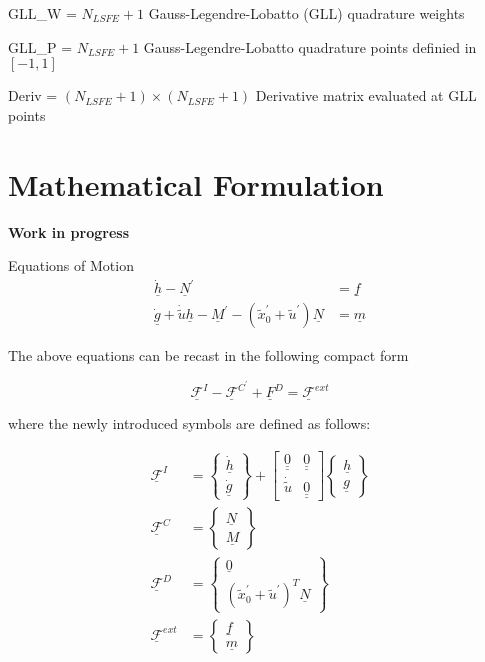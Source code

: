 \documentclass[11pt]{article}
\begin{document}
GLL\_W = $N_{LSFE} + 1$  Gauss-Legendre-Lobatto (GLL) quadrature weights 

GLL\_P = $N_{LSFE} + 1$  Gauss-Legendre-Lobatto quadrature points definied in
$[-1,1]$

Deriv = $(N_{LSFE} + 1) \times (N_{LSFE} + 1)$ Derivative matrix evaluated at GLL points

\section*{Mathematical Formulation}

\textbf{Work in progress}

Equations of Motion
\begin{align}
    \label{EoM}
    \underline{\dot{h}} - \underline{N}^\prime &= \underline{f} \\
    \underline{\dot{g}}+\dot{\tilde{u}} \underline{h} - \underline{M}^\prime - (\tilde{x}_0^\prime + \tilde{u}^\prime ) \underline{N} &= \underline{m}
\end{align}

The above equations can be recast in the following compact form

\begin{equation}
    \label{CompactEoM}
    \underline{\mathcal{F}}^I - \underline{\mathcal{F}}^{C^\prime} + \underline{F}^D =  \underline{\mathcal{F}}^{ext}
\end{equation}

where the newly introduced symbols are defined as follows:

\begin{align}
    \label{InertialForce}
    \underline{\mathcal{F}}^I &= \begin{Bmatrix}
    \underline{\dot{h}} \\
     \underline{\dot{g}}
     \end{Bmatrix}
     + \begin{bmatrix}
     \underline{\underline{0}} & \underline{\underline{0}} \\
     \dot{\tilde{u}} & \underline{\underline{0}}
     \end{bmatrix}
     \begin{Bmatrix}
     \underline{h} \\
     \underline{g}
     \end{Bmatrix} \\
     \underline{\mathcal{F}}^C &= \begin{Bmatrix}
     \underline{N} \\
     \underline{M}
     \end{Bmatrix} \\
     \underline{\mathcal{F}}^D &= \begin{Bmatrix}
     \underline{0} \\
     (\tilde{x}^\prime_0 + \tilde{u}^\prime )^T \underline{N}
     \end{Bmatrix}  \\
     \underline{\mathcal{F}}^{ext} &= \begin{Bmatrix}
     \underline{f} \\
     \underline{m}
     \end{Bmatrix}
\end{align}





\end{document}
